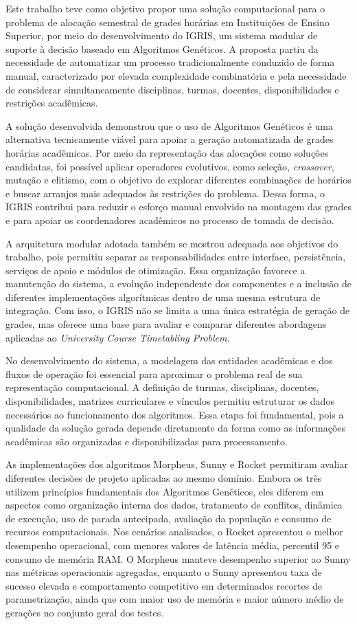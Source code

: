 Este trabalho teve como objetivo propor uma solução computacional para o problema de alocação semestral de grades horárias em Instituições de Ensino Superior, por meio do desenvolvimento do IGRIS, um sistema modular de suporte à decisão baseado em Algoritmos Genéticos. A proposta partiu da necessidade de automatizar um processo tradicionalmente conduzido de forma manual, caracterizado por elevada complexidade combinatória e pela necessidade de considerar simultaneamente disciplinas, turmas, docentes, disponibilidades e restrições acadêmicas.

A solução desenvolvida demonstrou que o uso de Algoritmos Genéticos é uma alternativa tecnicamente viável para apoiar a geração automatizada de grades horárias acadêmicas. Por meio da representação das alocações como soluções candidatas, foi possível aplicar operadores evolutivos, como seleção, \textit{crossover}, mutação e elitismo, com o objetivo de explorar diferentes combinações de horários e buscar arranjos mais adequados às restrições do problema. Dessa forma, o IGRIS contribui para reduzir o esforço manual envolvido na montagem das grades e para apoiar os coordenadores acadêmicos no processo de tomada de decisão.

A arquitetura modular adotada também se mostrou adequada aos objetivos do trabalho, pois permitiu separar as responsabilidades entre interface, persistência, serviços de apoio e módulos de otimização. Essa organização favorece a manutenção do sistema, a evolução independente dos componentes e a inclusão de diferentes implementações algorítmicas dentro de uma mesma estrutura de integração. Com isso, o IGRIS não se limita a uma única estratégia de geração de grades, mas oferece uma base para avaliar e comparar diferentes abordagens aplicadas ao \textit{University Course Timetabling Problem}.

No desenvolvimento do sistema, a modelagem das entidades acadêmicas e dos fluxos de operação foi essencial para aproximar o problema real de sua representação computacional. A definição de turmas, disciplinas, docentes, disponibilidades, matrizes curriculares e vínculos permitiu estruturar os dados necessários ao funcionamento dos algoritmos. Essa etapa foi fundamental, pois a qualidade da solução gerada depende diretamente da forma como as informações acadêmicas são organizadas e disponibilizadas para processamento.

As implementações dos algoritmos Morpheus, Sunny e Rocket permitiram avaliar diferentes decisões de projeto aplicadas ao mesmo domínio. Embora os três utilizem princípios fundamentais dos Algoritmos Genéticos, eles diferem em aspectos como organização interna dos dados, tratamento de conflitos, dinâmica de execução, uso de parada antecipada, avaliação da população e consumo de recursos computacionais. Nos cenários analisados, o Rocket apresentou o melhor desempenho operacional, com menores valores de latência média, percentil 95 e consumo de memória RAM. O Morpheus manteve desempenho superior ao Sunny nas métricas operacionais agregadas, enquanto o Sunny apresentou taxa de sucesso elevada e comportamento competitivo em determinados recortes de parametrização, ainda que com maior uso de memória e maior número médio de gerações no conjunto geral dos testes.

